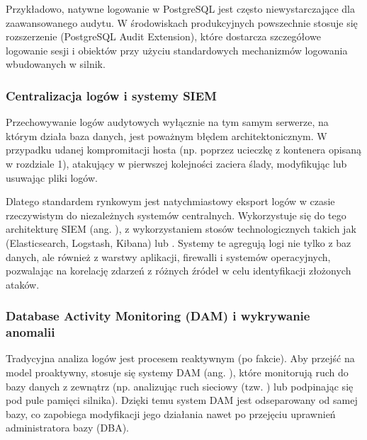 \documentclass[letterpaper,10pt,polish]{sphinxmanual}
\begin{document}
\sphinxAtStartPar
Przykładowo, natywne logowanie w PostgreSQL jest często niewystarczające dla zaawansowanego audytu. W środowiskach produkcyjnych powszechnie stosuje się rozszerzenie  (PostgreSQL Audit Extension), które dostarcza szczegółowe logowanie sesji i obiektów przy użyciu standardowych mechanizmów logowania wbudowanych w silnik.


\subsubsection{Centralizacja logów i systemy SIEM}
\label{\detokenize{rozdzia_u0142_2/rozdzia_u0142_27/rozdzial_5:centralizacja-logow-i-systemy-siem}}
\sphinxAtStartPar
Przechowywanie logów audytowych wyłącznie na tym samym serwerze, na którym działa baza danych, jest poważnym błędem architektonicznym. W przypadku udanej kompromitacji hosta (np. poprzez ucieczkę z kontenera opisaną w rozdziale 1), atakujący w pierwszej kolejności zaciera ślady, modyfikując lub usuwając pliki logów.

\sphinxAtStartPar
Dlatego standardem rynkowym jest natychmiastowy eksport logów w czasie rzeczywistym do niezależnych systemów centralnych. Wykorzystuje się do tego architekturę SIEM (ang. ), z wykorzystaniem stosów technologicznych takich jak  (Elasticsearch, Logstash, Kibana) lub . Systemy te agregują logi nie tylko z baz danych, ale również z warstwy aplikacji, firewalli i systemów operacyjnych, pozwalając na korelację zdarzeń z różnych źródeł w celu identyfikacji złożonych ataków.


\subsubsection{Database Activity Monitoring (DAM) i wykrywanie anomalii}
\label{\detokenize{rozdzia_u0142_2/rozdzia_u0142_27/rozdzial_5:database-activity-monitoring-dam-i-wykrywanie-anomalii}}
\sphinxAtStartPar
Tradycyjna analiza logów jest procesem reaktywnym (po fakcie). Aby przejść na model proaktywny, stosuje się systemy DAM (ang. ), które monitorują ruch do bazy danych z zewnątrz (np. analizując ruch sieciowy (tzw. ) lub podpinając się pod pule pamięci silnika). Dzięki temu system DAM jest odseparowany od samej bazy, co zapobiega modyfikacji jego działania nawet po przejęciu uprawnień administratora bazy (DBA).
\end{document}
